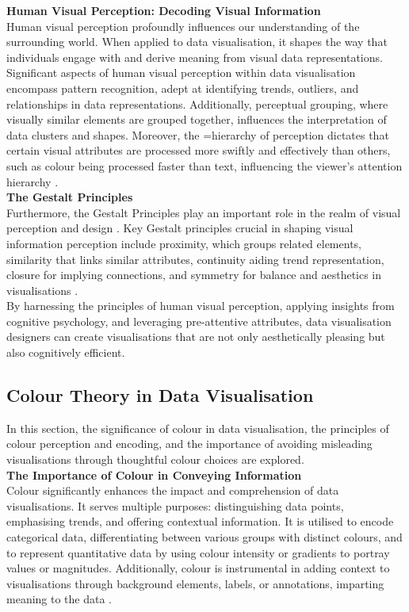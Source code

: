 \documentclass{article}\usepackage[]{graphicx}\usepackage[]{xcolor}
\numberwithin{equation}{section}
\begin{document}
\noindent \textbf{Human Visual Perception: Decoding Visual Information}\\
Human visual perception profoundly influences our understanding of the surrounding world. When applied to data visualisation, it shapes the way that individuals engage with and derive meaning from visual data representations.\\

\noindent 
Significant aspects of human visual perception within data visualisation encompass pattern recognition, adept at identifying trends, outliers, and relationships in data representations. Additionally, perceptual grouping, where visually similar elements are grouped together, influences the interpretation of data clusters and shapes. Moreover, the =hierarchy of perception dictates that certain visual attributes are processed more swiftly and effectively than others, such as colour being processed faster than text, influencing the viewer's attention hierarchy \cite{dastani2002role}.\\

\noindent \textbf{The Gestalt Principles }\\
Furthermore, the Gestalt Principles play an important role in the realm of visual perception and design \cite{rosli2015gestalt}. Key Gestalt principles crucial in shaping visual information perception include proximity, which groups related elements, similarity that links similar attributes, continuity aiding trend representation, closure for implying connections, and symmetry for balance and aesthetics in visualisations \cite{todorovic2008gestalt}. \\

\noindent By harnessing the principles of human visual perception, applying insights from cognitive psychology, and leveraging pre-attentive attributes, data visualisation designers can create visualisations that are not only aesthetically pleasing but also cognitively efficient.	

\subsection{Colour Theory in Data Visualisation}
In this section, the significance of colour in data visualisation, the principles of colour perception and encoding, and the importance of avoiding misleading visualisations through thoughtful colour choices are explored.\\

\noindent \textbf{The Importance of Colour in Conveying Information}\\
Colour significantly enhances the impact and comprehension of data visualisations. It serves multiple purposes: distinguishing data points, emphasising trends, and offering contextual information. It is utilised to encode categorical data, differentiating between various groups with distinct colours, and to represent quantitative data by using colour intensity or gradients to portray values or magnitudes. Additionally, colour is instrumental in adding context to visualisations through background elements, labels, or annotations, imparting meaning to the data \cite{healy2018data}.\\
\end{document}
